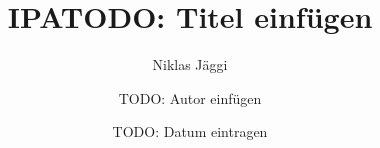 \documentclass[12pt]{report}
\author{Niklas Jäggi}
\title{IPA}
\title{TODO: Titel einfügen}
\author{TODO: Autor einfügen}
\date{TODO: Datum eintragen}
\begin{document}
{
  \raggedright
  \setlength{\parskip}{\baselineskip}
  
  
  
}
{
  \makeatletter


  \renewcommand\listoftables{%
      \section{\listtablename}%
      \@mkboth{\MakeUppercase\listtablename}%
              {\MakeUppercase\listtablename}%
      \@starttoc{lot}%
  }

  \renewcommand\listoffigures{%
      \section{\listfigurename}%
      \@mkboth{\MakeUppercase\listfigurename}%
          {\MakeUppercase\listfigurename}%
      \@starttoc{lof}%
  }

  \renewcommand\lstlistoflistings{%
      \section{Code Verzeichnis}%
      \@mkboth{Code Verzeichnis}%
          {Code Verzeichnis}%
      \@starttoc{lol}%
  }
  \makeatother
  
  

}
\end{document}
